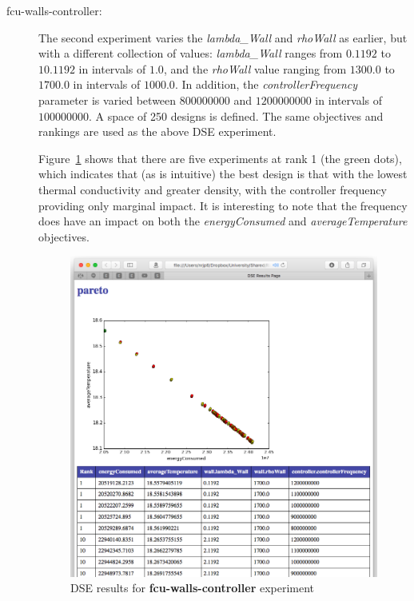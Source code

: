 \begin{description}
\item [fcu-walls-controller:] The second experiment varies the \emph{lambda\_Wall} and \emph{rhoWall} as earlier, but with a different collection of values: \emph{lambda\_Wall} ranges from $0.1192$ to $10.1192$ in intervals of $1.0$, and the \emph{rhoWall} value ranging from $1300.0$ to $1700.0$ in intervals of $1000.0$. In addition, the  \emph{controllerFrequency} parameter is varied between $800000000$ and $1200000000$ in intervals of $100000000$. A  space of 250 designs is defined. The same objectives and rankings are used as the above DSE experiment.

Figure~\ref{fig:fcu_dse2} shows that there are five experiments at rank 1 (the green dots), which indicates that (as is intuitive) the best design is that with the lowest thermal conductivity and greater density, with the controller frequency providing only marginal impact. It is interesting to note that the frequency does have an impact on both the   \emph{energyConsumed} and \emph{averageTemperature} objectives.

\begin{figure}[htb!]
\begin{center}
   \includegraphics[width=1\linewidth]{fcu/fcu-dse2} 
  \caption{DSE results for \textbf{fcu-walls-controller} experiment}
\label{fig:fcu_dse2}
\end{center}
\end{figure}



\end{description}

